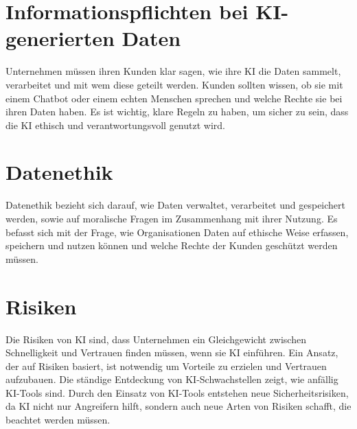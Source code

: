 \section{Informationspflichten bei KI-generierten Daten}
Unternehmen müssen ihren Kunden klar sagen, wie ihre KI die Daten sammelt, verarbeitet und mit wem diese geteilt werden. Kunden sollten wissen, ob sie mit einem Chatbot oder einem echten Menschen sprechen und welche Rechte sie bei ihren Daten haben. Es ist wichtig, klare  Regeln zu haben, um sicher zu sein, dass die KI ethisch und verantwortungsvoll genutzt wird.
\citep{ai-res-cmm360}

\section{Datenethik}

Datenethik bezieht sich darauf, wie Daten verwaltet, verarbeitet und gespeichert werden, sowie auf moralische Fragen im Zusammenhang mit ihrer Nutzung. Es befasst sich mit der Frage, wie Organisationen Daten auf ethische Weise erfassen, speichern und nutzen können und welche Rechte der Kunden geschützt werden müssen.
\citep{ai-ethik-pure}

\section{Risiken}
Die Risiken von KI sind, dass Unternehmen ein Gleichgewicht zwischen Schnelligkeit und Vertrauen finden müssen, wenn sie KI einführen. Ein Ansatz, der auf Risiken basiert, ist notwendig um Vorteile zu erzielen und Vertrauen aufzubauen. Die ständige Entdeckung von KI-Schwachstellen zeigt, wie anfällig KI-Tools sind. Durch den Einsatz von KI-Tools entstehen neue Sicherheitsrisiken, da KI nicht nur Angreifern hilft, sondern auch neue Arten von Risiken schafft, die beachtet werden müssen.
\citep{ai-risk}